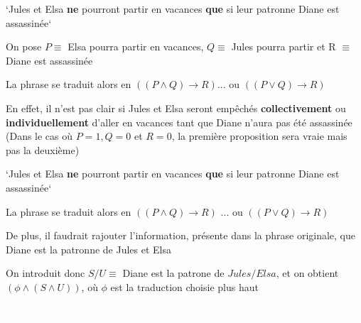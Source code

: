 \begin{frame}


`Jules et Elsa \textbf{ne} pourront partir en vacances \textbf{que} si leur patronne Diane est assassinée`\newline

On pose $P \equiv $ Elsa pourra partir en vacances, $Q \equiv $ Jules pourra partir et R $\equiv$ Diane est assassinée \pause\newline 

La phrase se traduit alors en $((P \wedge Q) \rightarrow R)$\pause ... ou $((P \vee Q) \rightarrow R )$\pause\newline

En effet, il n'est pas clair si Jules et Elsa seront empêchés \textbf{collectivement} ou \textbf{individuellement} d'aller en vacances tant que Diane n'aura pas été assassinée (Dans le cas où $P = 1, Q = 0$ et $R = 0$, la première proposition sera vraie mais pas la deuxième)

\end{frame}


\begin{frame}


`Jules et Elsa \textbf{ne} pourront partir en vacances \textbf{que} si leur patronne Diane est assassinée`\newline

La phrase se traduit alors en $((P \wedge Q) \rightarrow R)$ ... ou $((P \vee Q) \rightarrow R )$\newline

De plus, il faudrait rajouter l'information, présente dans la phrase originale, que Diane est la patronne de Jules et Elsa\newline\pause

On introduit donc $S / U \equiv$ Diane est la patrone de $Jules / Elsa$, et on obtient $(\phi \wedge (S \wedge U))$, où $\phi$ est la traduction choisie plus haut\newline

\textcolor{white}{On introduit donc $S / U \equiv$ est la patrone de $Jules / Elsa$, .}

\end{frame}



